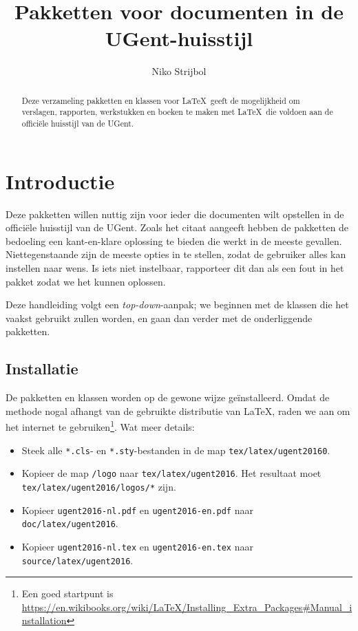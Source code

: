 \documentclass[11pt,parskip=half-]{scrartcl}
\title{Pakketten voor documenten in de UGent-huisstijl}
\author{Niko Strijbol}
\begin{document}
    \maketitle

    \begin{abstract}
        \noindent Deze verzameling pakketten en klassen voor \LaTeX\ geeft de mogelijkheid om verslagen, rapporten, werkstukken en boeken te maken met \LaTeX\ die voldoen aan de officiële huisstijl van de UGent.
    \end{abstract}

    \tableofcontents

    \section{Introductie}\label{sec:introductie}


    Deze pakketten willen nuttig zijn voor ieder die documenten wilt opstellen in de officiële huisstijl van de UGent. Zoals het citaat aangeeft hebben de pakketten de bedoeling een kant-en-klare oplossing te bieden die werkt in de meeste gevallen. Niettegenstaande zijn de meeste opties in te stellen, zodat de gebruiker alles kan instellen naar wens. Is iets niet instelbaar, rapporteer dit dan als een fout in het pakket zodat we het kunnen oplossen.

    Deze handleiding volgt een \emph{top-down}-aanpak; we beginnen met de klassen die het vaakst gebruikt zullen worden, en gaan dan verder met de onderliggende pakketten.

    \subsection{Installatie}\label{subsec:installatie}
    De pakketten en klassen worden op de gewone wijze geïnstalleerd. Omdat de methode nogal afhangt van de gebruikte distributie van \LaTeX, raden we aan om het internet te gebruiken\footnote{Een goed startpunt is \url{https://en.wikibooks.org/wiki/LaTeX/Installing_Extra_Packages\#Manual_installation}}. Wat meer details:

    \begin{itemize}
        \item Steek alle \texttt{*.cls}- en \texttt{*.sty}-bestanden in de map \texttt{tex/latex/ugent20160}.
        \item Kopieer de map \texttt{/logo} naar \texttt{tex/latex/ugent2016}. Het resultaat moet \texttt{tex/latex/ugent2016/logos/*} zijn.
        \item Kopieer \texttt{ugent2016-nl.pdf} en \texttt{ugent2016-en.pdf} naar \texttt{doc/latex/ugent2016}.
        \item Kopieer \texttt{ugent2016-nl.tex} en \texttt{ugent2016-en.tex} naar \texttt{source/latex/ugent2016}.
    \end{itemize}
\end{document}
